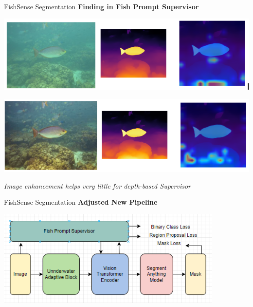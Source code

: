 \begin{frame}{FishSense Segmentation}
    \centering
    \textbf{Finding in Fish Prompt Supervisor}

    \vspace{0.3cm} %

    \begin{minipage}{0.48\textwidth}
        \centering
        \includegraphics[width=\textwidth]{images/fs_depth_1.png}\\
    \end{minipage}
    \hfill
    \begin{minipage}{0.48\textwidth}
        \centering
        \includegraphics[width=\textwidth]{images/fs_depth_2.png}\\
    \end{minipage}

    \vspace{0.3cm} %

    \textit{Image enhancement helps very little for depth-based Supervisor}
\end{frame}

\begin{frame}{FishSense Segmentation}
    \centering
    \textbf{Adjusted New Pipeline}

    \vspace{0.3cm} %

    \includegraphics[width=0.85\textwidth,keepaspectratio]{images/fs_seg_pipeline4.png}
\end{frame}

